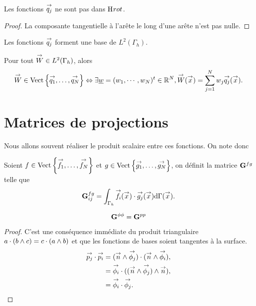     \begin{prop}
      Les fonctions \(\qj\) ne sont pas dans \(\Hrot\).
    \end{prop}
    \begin{proof}
      La composante tangentielle à l'arête le long d'une arête n'est pas nulle.
    \end{proof}

    \begin{prop}
      Les fonctions \(\qj\) forment une base de \(L^2(\Gamma_h)\).
    \end{prop}

    \begin{defn}
      Pour tout \(\vect{W} \in L^2(\Gamma_h)\), alors
      \begin{equation*}
        \vect{W} \in \Vect{\vect{q_1},\ldots,\vect{q_N}} \Leftrightarrow \exists \comp{w} = (w_1,\cdots,w_N)^t \in \RR^N, \vect{W}(\vx) = \sum_{j=1}^N w_j \qj(\vx).
      \end{equation*}
    \end{defn}


\section{Matrices de projections}

  Nous allons souvent réaliser le produit scalaire entre ces fonctions. On note donc
  \begin{defn}
    Soient \(f \in \Vect{\vect{f_1},\ldots,\vect{f_N}}\) et \(g \in \Vect{\vect{g_1},\ldots,\vect{g_N}}\), on définit la matrice \(\mG{f}{g}\) telle que
    \begin{equation*}
      \mG{f}{g}_{ij} = \int_{\Gamma_h} \vect{f_i}(\vx)\cdot \vect{g_j}(\vx) \dd{\Gamma}(\vx).
    \end{equation*}
  \end{defn}

  \begin{prop}
    \begin{equation*}
      \mG{\phi}{\phi} = \mG{p}{p}
    \end{equation*}
  \end{prop}
  \begin{proof}
    C'est une conséquence immédiate du produit triangulaire \(a\cdot (b \pvect c) = c\cdot (a \pvect b)\) et que les fonctions de bases soient tangentes à la surface.
    \[
      \begin{aligned}
        \pj \cdot \pii &= (\vn \pvect \phij) \cdot ( \vn \pvect \phii),
        \\
        &= \phii \cdot ( (\vn \pvect \phij) \pvect \vn),
        \\
        &= \phii \cdot \phij.
      \end{aligned}
    \]
  \end{proof}

